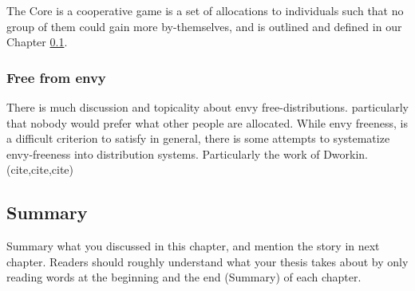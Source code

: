 The Core is a cooperative game is a set of allocations to individuals such that no group of them could gain more by-themselves, and is outlined and defined in our Chapter \ref{}.


\subsubsection{Free from envy}

There is much discussion and topicality about envy free-distributions.
particularly that nobody would prefer what other people are allocated.
While envy freeness, is a difficult criterion to satisfy in general, there is some attempts to systematize envy-freeness into distribution systems.
Particularly the work of Dworkin. (cite,cite,cite)







\subsection{Summary}
Summary what you discussed in this chapter, and mention the story in next
chapter. Readers should roughly understand what your thesis takes about by only reading
words at the beginning and the end (Summary) of each chapter.



